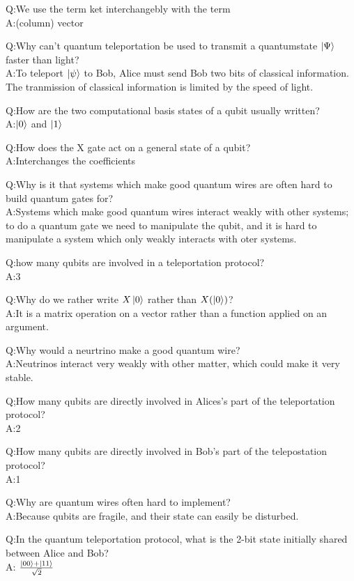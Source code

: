 \documentclass[a4paper, addpoints, 12pt
    , noanswers    %
    ]{exam}
\begin{document}
\begin{questions}
Q:We use the term ket interchangebly with the term\\
A:(column) vector

Q:Why can't quantum teleportation be used to transmit a quantumstate $\ket{\Psi}$ faster than light?\\
A:To teleport $\ket{\psi}$ to Bob, Alice must send Bob two bits of classical information. The tranmission of classical information is limited by the speed of light.

Q:How are the two computational basis states of a qubit usually written?\\
A:$\ket{0}$ and $\ket{1}$

Q:How does the X gate act on a general state of a qubit?\\
A:Interchanges the coefficients

Q:Why is it that systems which make good quantum wires are often hard to build quantum gates for?\\
A:Systems which make good quantum wires interact weakly with other systems; to do a quantum gate we need to manipulate the qubit, and it is hard to manipulate a system which only weakly interacts with oter systems.

Q:how many qubits are involved in a teleportation protocol?\\A:3

Q:Why do we rather write $X\ket{0}$ rather than $X(\ket{0})$?\\
A:It is a matrix operation on a vector rather than a function applied on an argument.

Q:Why would a neurtrino make a good quantum wire?\\
A:Neutrinos interact very weakly with other matter, which could make it very stable.

Q;How many qubits are directly involved in Alices's part of the teleportation protocol?\\
A:2

Q:How many qubits are directly involved in Bob's part of the telepostation protocol?\\
A:1

Q:Why are quantum wires often hard to implement?\\
A:Because qubits are fragile, and their state can easily be disturbed.

Q:In the quantum teleportation protocol, what is the 2-bit state initially shared between Alice and Bob?\\
A: $\frac{\ket{00}+\ket{11}}{\sqrt{2}}$


\end{questions}
\end{document}
